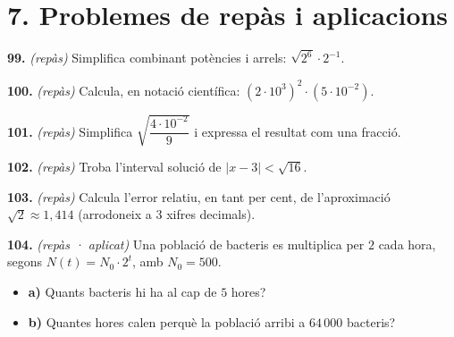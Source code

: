 \documentclass[13pt,a4paper]{extarticle}
\begin{document}
\section*{7. Problemes de repàs i aplicacions}

\par\noindent\begin{minipage}{\linewidth}
\textbf{99.} \emph{(repàs)} Simplifica combinant potències i arrels: $\sqrt{2^6}\cdot 2^{-1}$.\par
\end{minipage}\par\vspace{1.6mm}
\par\noindent\begin{minipage}{\linewidth}
\textbf{100.} \emph{(repàs)} Calcula, en notació científica: $\left(2\cdot10^3\right)^2 \cdot \left(5\cdot10^{-2}\right)$.\par
\end{minipage}\par\vspace{1.6mm}
\par\noindent\begin{minipage}{\linewidth}
\textbf{101.} \emph{(repàs)} Simplifica $\sqrt{\dfrac{4\cdot10^{-2}}{9}}$ i expressa el resultat com una fracció.\par
\end{minipage}\par\vspace{1.6mm}
\par\noindent\begin{minipage}{\linewidth}
\textbf{102.} \emph{(repàs)} Troba l'interval solució de $|x-3|<\sqrt{16}$.\par
\end{minipage}\par\vspace{1.6mm}
\par\noindent\begin{minipage}{\linewidth}
\textbf{103.} \emph{(repàs)} Calcula l'error relatiu, en tant per cent, de l'aproximació $\sqrt2 \approx 1{,}414$ (arrodoneix a $3$ xifres decimals).\par
\end{minipage}\par\vspace{1.6mm}
\par\noindent\begin{minipage}{\linewidth}
\textbf{104.} \emph{(repàs · aplicat)} Una població de bacteris es multiplica per $2$ cada hora, segons $N\left(t\right)=N_0\cdot 2^t$, amb $N_0=500$.\par

\begin{itemize}[leftmargin=0pt,itemsep=3pt,topsep=3pt,parsep=0pt,label={}]
\item \textbf{a)} Quants bacteris hi ha al cap de $5$ hores?
\item \textbf{b)} Quantes hores calen perquè la població arribi a $64\,000$ bacteris?
\end{itemize}
\end{minipage}\par\vspace{1.6mm}
\end{document}
